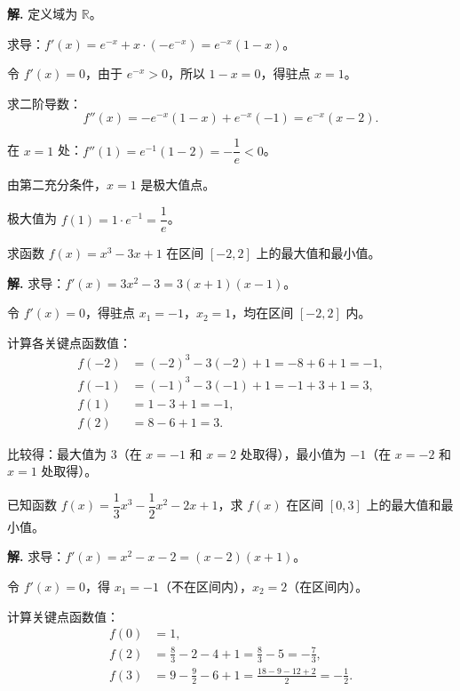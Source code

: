 \documentclass[11pt]{ctexrep}
\begin{document}
\textbf{解.} 定义域为 $\mathbb{R}$。

求导：$f'(x) = e^{-x} + x \cdot (-e^{-x}) = e^{-x}(1 - x)$。

令 $f'(x) = 0$，由于 $e^{-x} > 0$，所以 $1 - x = 0$，得驻点 $x = 1$。

求二阶导数：
\[
    f''(x) = -e^{-x}(1 - x) + e^{-x}(-1) = e^{-x}(x - 2).
\]

在 $x = 1$ 处：$f''(1) = e^{-1}(1 - 2) = -\dfrac{1}{e} < 0$。

由第二充分条件，$x = 1$ 是极大值点。

极大值为 $f(1) = 1 \cdot e^{-1} = \dfrac{1}{e}$。

\begin{example}[求闭区间上的最值]
    求函数 $f(x) = x^3 - 3x + 1$ 在区间 $[-2, 2]$ 上的最大值和最小值。
\end{example}

\textbf{解.} 求导：$f'(x) = 3x^2 - 3 = 3(x + 1)(x - 1)$。

令 $f'(x) = 0$，得驻点 $x_1 = -1$，$x_2 = 1$，均在区间 $[-2, 2]$ 内。

计算各关键点函数值：
\begin{align*}
    f(-2) &= (-2)^3 - 3(-2) + 1 = -8 + 6 + 1 = -1, \\[4pt]
    f(-1) &= (-1)^3 - 3(-1) + 1 = -1 + 3 + 1 = 3, \\[4pt]
    f(1) &= 1 - 3 + 1 = -1, \\[4pt]
    f(2) &= 8 - 6 + 1 = 3.
\end{align*}

比较得：最大值为 $3$（在 $x = -1$ 和 $x = 2$ 处取得），最小值为 $-1$（在 $x = -2$ 和 $x = 1$ 处取得）。

\begin{realexam}[2024 上海一模]
    已知函数 $f(x) = \dfrac{1}{3}x^3 - \dfrac{1}{2}x^2 - 2x + 1$，求 $f(x)$ 在区间 $[0, 3]$ 上的最大值和最小值。
\end{realexam}

\textbf{解.} 求导：$f'(x) = x^2 - x - 2 = (x - 2)(x + 1)$。

令 $f'(x) = 0$，得 $x_1 = -1$（不在区间内），$x_2 = 2$（在区间内）。

计算关键点函数值：
\begin{align*}
    f(0) &= 1, \\[4pt]
    f(2) &= \frac{8}{3} - 2 - 4 + 1 = \frac{8}{3} - 5 = -\frac{7}{3}, \\[4pt]
    f(3) &= 9 - \frac{9}{2} - 6 + 1 = \frac{18 - 9 - 12 + 2}{2} = -\frac{1}{2}.
\end{align*}
\end{document}
